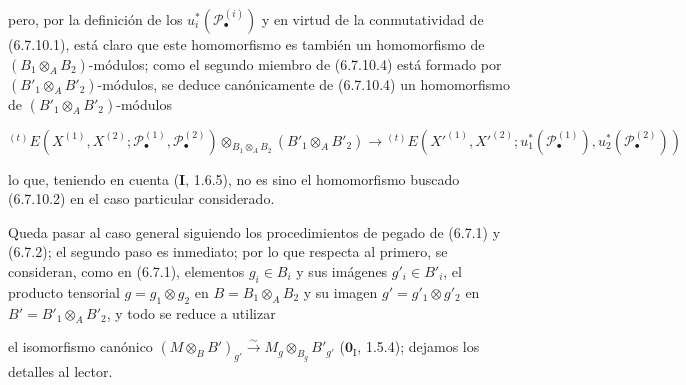 \begin{env}[6.7.10]
pero, por la definición de los $u_i^*(\mathscr P_\bullet^{(i)})$ y en virtud
de la conmutatividad de (6.7.10.1), está claro que este homomorfismo es también
un homomorfismo de $(B_1\otimes_A B_2)$-módulos; como el segundo miembro de
(6.7.10.4) está formado por $(B'_1\otimes_A B'_2)$-módulos, se deduce
canónicamente de (6.7.10.4) un homomorfismo de
$(B'_1\otimes_A B'_2)$-módulos

\label{III.6.7.10.5}
\[
  {}^{(t)}E
  (X^{(1)},X^{(2)};\mathscr P_\bullet^{(1)},\mathscr P_\bullet^{(2)})
  \otimes_{B_1\otimes_A B_2}(B'_1\otimes_A B'_2)
  \longrightarrow
  {}^{(t)}E
  (X'^{(1)},X'^{(2)};
   u_1^*(\mathscr P_\bullet^{(1)}),u_2^*(\mathscr P_\bullet^{(2)}))
  \tag{6.7.10.5}\label{III.6.7.10.5.fr}
\]

lo que, teniendo en cuenta (\textbf I, 1.6.5), no es sino el homomorfismo buscado
(6.7.10.2) en el caso particular considerado.

Queda pasar al caso general siguiendo los procedimientos de pegado de (6.7.1)
y (6.7.2); el
segundo paso es inmediato; por lo que respecta al primero, se consideran, como
en (6.7.1), elementos $g_i\in B_i$ y sus imágenes $g'_i\in B'_i$, el producto
tensorial $g=g_1\otimes g_2$ en $B=B_1\otimes_A B_2$ y su imagen
$g'=g'_1\otimes g'_2$ en $B'=B'_1\otimes_A B'_2$, y todo se reduce a utilizar

el isomorfismo canónico
$(M\otimes_B B')_{g'}\xrightarrow{\sim}M_g\otimes_{B_g}B'_{g'}$
($\mathbf{0}_{\mathrm I}$, 1.5.4); dejamos los detalles al lector.
\end{env}

